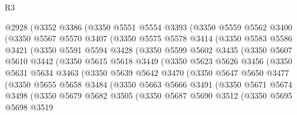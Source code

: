 \begin{lexlean}{R3}
\begin{coremodule}
    @2928
      (@3352
        @3386
        (@3350
          @5551
          @5554
          @3393
          (@3350
            @5559
            @5562
            @3400
            (@3350
              @5567
              @5570
              @3407
              (@3350
                @5575
                @5578
                @3414
                (@3350
                  @5583
                  @5586
                  @3421
                  (@3350
                    @5591
                    @5594
                    @3428
                    (@3350
                      @5599
                      @5602
                      @3435
                      (@3350
                        @5607
                        @5610
                        @3442
                        (@3350
                          @5615
                          @5618
                          @3449
                          (@3350
                            @5623
                            @5626
                            @3456
                            (@3350
                              @5631
                              @5634
                              @3463
                              (@3350
                                @5639
                                @5642
                                @3470
                                (@3350
                                  @5647
                                  @5650
                                  @3477
                                  (@3350
                                    @5655
                                    @5658
                                    @3484
                                    (@3350
                                      @5663
                                      @5666
                                      @3491
                                      (@3350
                                        @5671
                                        @5674
                                        @3498
                                        (@3350
                                          @5679
                                          @5682
                                          @3505
                                          (@3350
                                            @5687
                                            @5690
                                            @3512
                                            (@3350
                                              @5695
                                              @5698
                                              @3519

\end{coremodule}
\end{lexlean}

